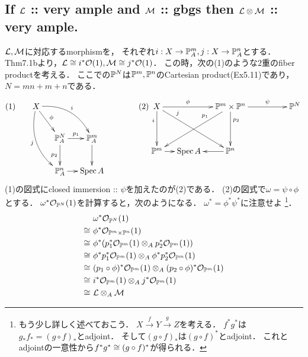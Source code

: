 \documentclass[a4paper]{jsarticle}
\begin{document}
    \subsection{If $\mathcal{L}$ :: very ample and $\mathcal{M}$ :: gbgs then $\mathcal{L} \otimes \mathcal{M}$ :: very ample.}
    $\mathcal{L}, \mathcal{M}$に対応するmorphismを，
    それぞれ$i: X \to \mathbb{P}^m_A, j: X \to \mathbb{P}^n_A$とする．
    Thm7.1bより，$\mathcal{L} \cong i^* \mathcal{O}(1), \mathcal{M} \cong j^* \mathcal{O}(1)$．
    この時，次の(1)のような$2$重のfiber productを考える．
    ここでの$\mathbb{P}^N$は$\mathbb{P}^m, \mathbb{P}^n$のCartesian product(Ex5.11)であり，
    $N=mn+m+n$である．
    \[
        (1)
        \xymatrix@C=12pt
        {
            {} & X \ar@/^15pt/[rrd]^-{i}\ar@/_15pt/[ddr]_-{j}\ar[rd]^-{\phi}& {} &  {} \\
            {} & {} & \proj^{N}_A \ar[r]^-{p_1}\ar[d]_-{p_2}& \proj^m_A \ar[d] \\
            {} & {} & \proj^n_A \ar[r]& \Spec A
        }
        \hspace{40pt}
        (2)
        \xymatrix@C=12pt@R=40pt
        {
            X \ar[d]_(.3){i}\ar[rrd]^(.25){j}\ar[rr]^-{\phi}&
                {} &
                \proj^m \times \proj^n \ar[lld]_(.3){p_1}\ar[d]^(.3){p_2}\ar[rrr]^-{\psi}&
                {} &
                {} &
                \proj^N \\
            \proj^m \ar[r]& \Spec A &\ar[l] \proj^n & {} & {}
        }
    \]
    (1)の図式にclosed immersion :: $\psi$を加えたのが(2)である．
    (2)の図式で$\omega=\psi \circ \phi$とする．
    $\omega^*\mathcal{O}_{\mathbb{P}^N}(1)$を計算すると，次のようになる．
    $\omega^*=\phi^*\psi^*$に注意せよ
    \footnote
        {
            もう少し詳しく述べておこう．
            $X \xrightarrow{f} Y \xrightarrow{g} Z$を考える．
            $f^* g^*$は$g_* f_*=(g \circ f)_*$とadjoint．
            そして$(g \circ f)_*$は$(g \circ f)^*$とadjoint．
            これとadjointの一意性から$f^* g^* \cong (g \circ f)^*$が得られる．
        }．
    \begin{align*}
        {}&     ~\omega^*\mathcal{O}_{\mathbb{P}^N}(1) \\
        \cong&   ~\phi^*\mathcal{O}_{\mathbb{P}^m \times \mathbb{P}^n}(1) \\
        \cong&   ~\phi^* (p_1^* \mathcal{O}_{\mathbb{P}^m}(1) \otimes_A p_2^* \mathcal{O}_{\mathbb{P}^m}(1)) \\
        \cong&   ~\phi^* p_1^* \mathcal{O}_{\mathbb{P}^m}(1) \otimes_A \phi^* p_2^* \mathcal{O}_{\mathbb{P}^m}(1) \\
        \cong&   ~(p_1 \circ \phi)^* \mathcal{O}_{\mathbb{P}^m}(1) \otimes_A (p_2 \circ \phi)^* \mathcal{O}_{\mathbb{P}^m}(1) \\
        \cong&   ~i^* \mathcal{O}_{\mathbb{P}^m}(1) \otimes_A j^* \mathcal{O}_{\mathbb{P}^m}(1) \\
        \cong&   ~\mathcal{L} \otimes_A \mathcal{M}
    \end{align*}
\end{document}
